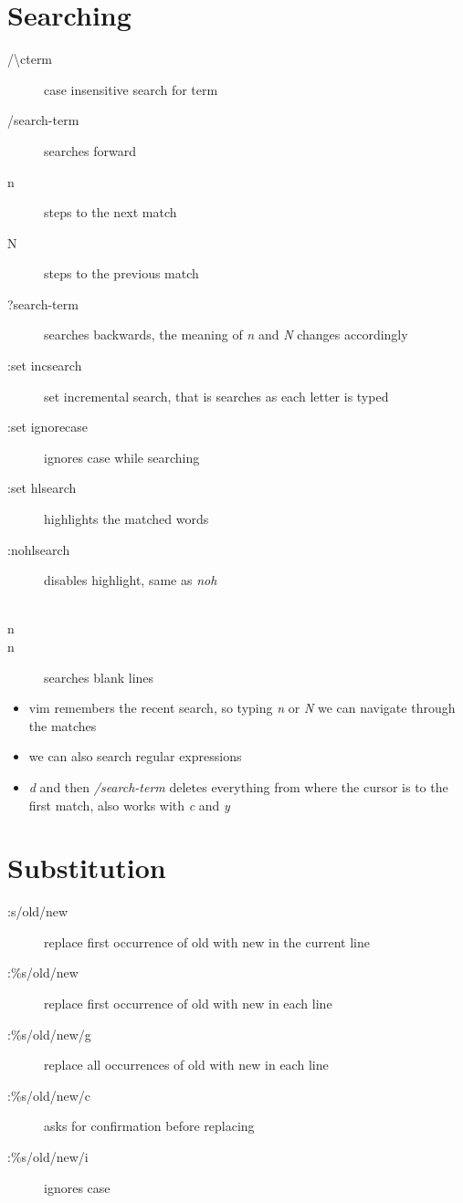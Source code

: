 \documentclass[a4paper, 12pt]{article}
\begin{document}
\section{Searching}
\begin{description}
	\item[/\textbackslash cterm] case insensitive search for term
	\item[/search-term] searches forward
	\item[n] steps to the next match
	\item[N] steps to the previous match
	\item[?search-term] searches backwards, the meaning of \emph{n} and \emph{N} changes accordingly
	\item[:set incsearch] set incremental search, that is searches as each letter is typed
	\item[:set ignorecase] ignores case while searching
	\item[:set hlsearch] highlights the matched words
	\item[:nohlsearch] disables highlight, same as \emph{noh}
	\item[\\n\\n] searches blank lines
\end{description}

\begin{itemize}
	\item vim remembers the recent search, so typing \emph{n} or \emph{N} we can navigate through the matches 
	\item we can also search regular expressions
	\item \emph{d} and then \emph{/search-term} deletes everything from where the cursor is to the first match, also works with \emph{c} and \emph{y}
\end{itemize}

\section{Substitution}
\begin{description}
	\item[:s/old/new] replace first occurrence of old with new in the current line 
	\item[:\%s/old/new] replace first occurrence of old with new in each line
	\item[:\%s/old/new/g] replace all occurrences of old with new in each line
	\item[:\%s/old/new/c] asks for confirmation before replacing
	\item[:\%s/old/new/i] ignores case
\end{description}
\end{document}
